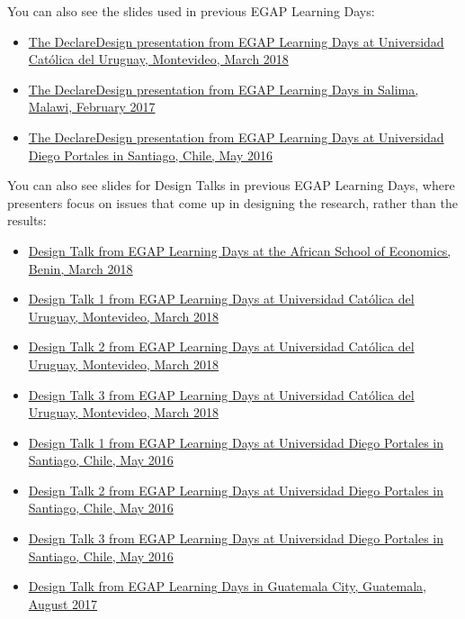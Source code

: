 \documentclass[12pt,]{book}
\begin{document}
You can also see the slides used in previous EGAP Learning Days:

\begin{itemize}
\item
  \href{https://egap.github.io/learningdays-resources/Slides/Examples/declare_design-montevideo.pdf}{The DeclareDesign presentation from EGAP Learning Days at Universidad Católica del Uruguay, Montevideo, March 2018}
\item
  \href{https://egap.github.io/learningdays-resources/Slides/Examples/declare_design-malawi.pdf}{The DeclareDesign presentation from EGAP Learning Days in Salima, Malawi, February 2017}
\item
  \href{https://egap.github.io/learningdays-resources/Slides/Examples/declare_design-santiago.pdf}{The DeclareDesign presentation from EGAP Learning Days at Universidad Diego Portales in Santiago, Chile, May 2016}
\end{itemize}

You can also see slides for Design Talks in previous EGAP Learning Days, where presenters focus on issues that come up in designing the research, rather than the results:

\begin{itemize}
\item
  \href{https://egap.github.io/learningdays-resources/Slides/Examples/research_design_2-benin.pdf}{Design Talk from EGAP Learning Days at the African School of Economics, Benin, March 2018}
\item
  \href{https://egap.github.io/learningdays-resources/Slides/Examples/research_design_1-montevideo.pdf}{Design Talk 1 from EGAP Learning Days at Universidad Católica del Uruguay, Montevideo, March 2018}
\item
  \href{https://egap.github.io/learningdays-resources/Slides/Examples/research_design_2-montevideo.pdf}{Design Talk 2 from EGAP Learning Days at Universidad Católica del Uruguay, Montevideo, March 2018}
\item
  \href{https://egap.github.io/learningdays-resources/Slides/Examples/research_design_3-montevideo.pdf}{Design Talk 3 from EGAP Learning Days at Universidad Católica del Uruguay, Montevideo, March 2018}
\item
  \href{https://egap.github.io/learningdays-resources/Slides/Examples/research_design_1-santiago.pdf}{Design Talk 1 from EGAP Learning Days at Universidad Diego Portales in Santiago, Chile, May 2016}
\item
  \href{https://egap.github.io/learningdays-resources/Slides/Examples/research_design_2-santiago.pdf}{Design Talk 2 from EGAP Learning Days at Universidad Diego Portales in Santiago, Chile, May 2016}
\item
  \href{https://egap.github.io/learningdays-resources/Slides/Examples/research_design_3-santiago.pdf}{Design Talk 3 from EGAP Learning Days at Universidad Diego Portales in Santiago, Chile, May 2016}
\item
  \href{https://egap.github.io/learningdays-resources/Slides/Examples/research_design-guatemala.pdf}{Design Talk from EGAP Learning Days in Guatemala City, Guatemala, August 2017}
\end{itemize}
\end{document}
